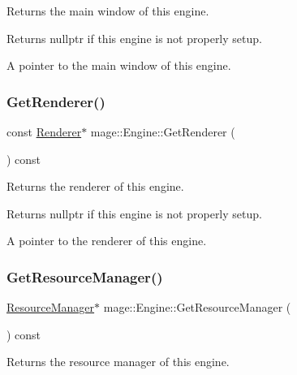 Returns the main window of this engine.

\begin{DoxyReturn}{Returns}
{\ttfamily nullptr} if this engine is not properly setup. 

A pointer to the main window of this engine. 
\end{DoxyReturn}
\hypertarget{classmage_1_1_engine_a91f77d4f1914e1d63d405444a590615b}{}\label{classmage_1_1_engine_a91f77d4f1914e1d63d405444a590615b} 
\subsubsection{\texorpdfstring{Get\+Renderer()}{GetRenderer()}}
{\footnotesize\ttfamily const \hyperlink{classmage_1_1_renderer}{Renderer}$\ast$ mage\+::\+Engine\+::\+Get\+Renderer (\begin{DoxyParamCaption}{ }\end{DoxyParamCaption}) const\hspace{0.3cm}{\ttfamily [noexcept]}}

Returns the renderer of this engine.

\begin{DoxyReturn}{Returns}
{\ttfamily nullptr} if this engine is not properly setup. 

A pointer to the renderer of this engine. 
\end{DoxyReturn}
\hypertarget{classmage_1_1_engine_a8b89ee555f5208a99872d724389eba0b}{}\label{classmage_1_1_engine_a8b89ee555f5208a99872d724389eba0b} 
\subsubsection{\texorpdfstring{Get\+Resource\+Manager()}{GetResourceManager()}}
{\footnotesize\ttfamily \hyperlink{classmage_1_1_resource_manager}{Resource\+Manager}$\ast$ mage\+::\+Engine\+::\+Get\+Resource\+Manager (\begin{DoxyParamCaption}{ }\end{DoxyParamCaption}) const\hspace{0.3cm}{\ttfamily [noexcept]}}

Returns the resource manager of this engine.

